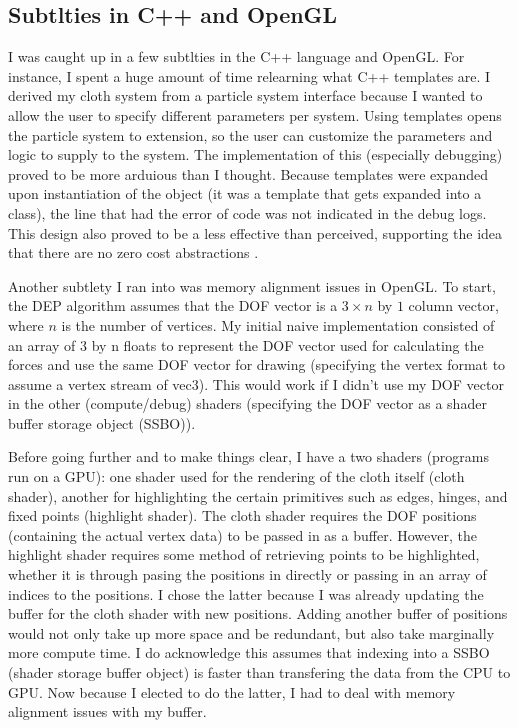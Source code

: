 \documentclass[letterpaper, 10 pt, conference]{ieeeconf}  %
\begin{document}
\subsection{Subtlties in C++ and OpenGL}
        I was caught up in a few subtlties in the C++ language and OpenGL. For instance, I spent a huge amount of time relearning what C++ templates are. I derived my cloth system from a particle system interface because I wanted to allow the user to specify different parameters per system. Using templates opens the particle system to extension, so the user can customize the parameters and logic to supply to the system. The implementation of this (especially debugging) proved to be more arduious than I thought. Because templates were expanded upon instantiation of the object (it was a template that gets expanded into a class), the line that had the error of code was not indicated in the debug logs. This design also proved to be a less effective than perceived, supporting the idea that there are no zero cost abstractions \cite{caruth2019}. 

        Another subtlety I ran into was memory alignment issues in OpenGL. To start, the DEP algorithm assumes that the DOF vector is a $ 3 \times n $ by $ 1 $ column vector, where $n$ is the number of vertices. My initial naive implementation consisted of an array of 3 by n floats to represent the DOF vector used for calculating the forces and use the same DOF vector for drawing (specifying the vertex format to assume a vertex stream of vec3). This would work if I didn't use my DOF vector in the other (compute/debug) shaders (specifying the DOF vector as a shader buffer storage object (SSBO)).

        Before going further and to make things clear, I have a two shaders (programs run on a GPU): one shader used for the rendering of the cloth itself (cloth shader), another for highlighting the certain primitives such as edges, hinges, and fixed points (highlight shader). The cloth shader requires the DOF positions (containing the actual vertex data) to be passed in as a buffer. However, the highlight shader requires some method of retrieving points to be highlighted, whether it is through pasing the positions in directly or passing in an array of indices to the positions. I chose the latter because I was already updating the buffer for the cloth shader with new positions. Adding another buffer of positions would not only take up more space and be redundant, but also take marginally more compute time. I do acknowledge this assumes that indexing into a SSBO (shader storage buffer object) is faster than transfering the data from the CPU to GPU. Now because I elected to do the latter, I had to deal with memory alignment issues with my buffer. 
\end{document}
